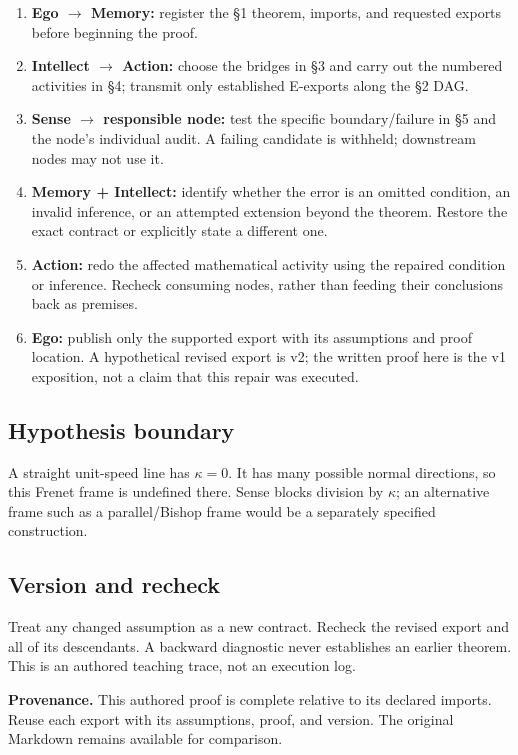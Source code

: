 \documentclass[preprint,12pt,aps,pra,showkeys,amsmath,amssymb,superscriptaddress,floatfix]{revtex4-2}
\theoremstyle{definition}
\theoremstyle{remark}
\providecommand{\tightlist}{\setlength{\itemsep}{2pt}\setlength{\parskip}{0pt}}
\begin{document}
\begin{enumerate}
\def\labelenumi{\arabic{enumi}.}
\tightlist
\item
  \textbf{Ego \(\to\) Memory:} register the §1 theorem, imports, and
  requested exports before beginning the proof.
\item
  \textbf{Intellect \(\to\) Action:} choose the bridges in §3 and carry
  out the numbered activities in §4; transmit only established E-exports
  along the §2 DAG.
\item
  \textbf{Sense \(\to\) responsible node:} test the specific
  boundary/failure in §5 and the node's individual audit. A failing
  candidate is withheld; downstream nodes may not use it.
\item
  \textbf{Memory + Intellect:} identify whether the error is an omitted
  condition, an invalid inference, or an attempted extension beyond the
  theorem. Restore the exact contract or explicitly state a different
  one.
\item
  \textbf{Action:} redo the affected mathematical activity using the
  repaired condition or inference. Recheck consuming nodes, rather than
  feeding their conclusions back as premises.
\item
  \textbf{Ego:} publish only the supported export with its assumptions
  and proof location. A hypothetical revised export is v2; the written
  proof here is the v1 exposition, not a claim that this repair was
  executed.
\end{enumerate}

\subsection{Hypothesis boundary}
A straight unit-speed line has \(\kappa =0\). It has many possible
normal directions, so this Frenet frame is undefined there. Sense blocks
division by \(\kappa\); an alternative frame such as a parallel/Bishop
frame would be a separately specified construction.

\subsection{Version and recheck}
Treat any changed assumption as a new contract. Recheck the revised
export and all of its descendants. A backward diagnostic never
establishes an earlier theorem. This is an authored teaching trace, not
an execution log.

\par\medskip\begingroup\small\linespread{1.0}\selectfont\noindent\textbf{Provenance.} This authored proof is complete relative to its declared imports. Reuse
each export with its assumptions, proof, and version. The original
Markdown remains available for comparison.
\par\endgroup
\end{document}
